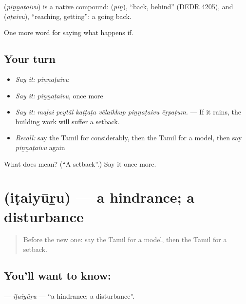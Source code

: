 \begin{cousinweb}
\textbf{} (\emph{piṉṉaṭaivu}) is a native compound:  (\emph{piṉ}), \textquotedblleft{}back, behind\textquotedblright{} (DEDR 4205), and  (\emph{aṭaivu}), \textquotedblleft{}reaching, getting\textquotedblright{}: a going back.
\end{cousinweb}

\begin{grammarlens}[title={What you've built}]
One more word for saying what happens if.
\end{grammarlens}

\subsection*{Your turn}
\begin{itemize}
\raggedright
  \item \emph{Say it:} \emph{piṉṉaṭaivu}
  \item \emph{Say it:} \emph{piṉṉaṭaivu}, once more
  \item \emph{Say it:} \emph{maḻai peytāl kaṭṭaṭa vēlaikkup piṉṉaṭaivu ēṟpaṭum.} — If it rains, the building work will suffer a setback.
  \item \emph{Recall:} say the Tamil for considerably, then the Tamil for a model, then say \emph{piṉṉaṭaivu} again
\end{itemize}

\begin{tcolorbox}[breakable,colback=teal!4,colframe=teal!35!black,title={Before you move on}]
What does  mean? (\textquotedblleft{}A setback\textquotedblright{}.) Say it once more.
\end{tcolorbox}
\section[\texorpdfstring{\ta{இடையூறு} (iṭaiyūṟu)}{இடையூறு (iṭaiyūṟu)}]{ (iṭaiyūṟu) — a hindrance; a disturbance}

\label{lesson:TA-C546-itaiyuru}



\begin{quote}
Before the new one: say the Tamil for a model, then the Tamil for a setback.
\end{quote}

\subsection*{You'll want to know: }
\textbf{} — \emph{iṭaiyūṟu} — \textquotedblleft{}a hindrance; a disturbance\textquotedblright{}.


